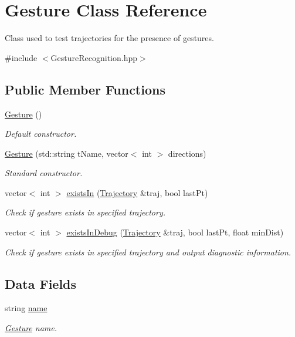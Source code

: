 \hypertarget{classGesture}{\section{\-Gesture \-Class \-Reference}
\label{classGesture}
}


\-Class used to test trajectories for the presence of gestures.  




{\ttfamily \#include $<$\-Gesture\-Recognition.\-hpp$>$}

\subsection*{\-Public \-Member \-Functions}
\begin{DoxyCompactItemize}
\item 
\hyperlink{classGesture_a840ff60bea4128f137c5b114abc844f6}{\-Gesture} ()
\begin{DoxyCompactList}\small\item\em \-Default constructor. \end{DoxyCompactList}\item 
\hyperlink{classGesture_a659397e6358ea7c376a804e00595c5a2}{\-Gesture} (std\-::string t\-Name, vector$<$ int $>$ directions)
\begin{DoxyCompactList}\small\item\em \-Standard constructor. \end{DoxyCompactList}\item 
vector$<$ int $>$ \hyperlink{classGesture_aaf8e214d540530cf9478d7b4af6db650}{exists\-In} (\hyperlink{classTrajectory}{\-Trajectory} \&traj, bool last\-Pt)
\begin{DoxyCompactList}\small\item\em \-Check if gesture exists in specified trajectory. \end{DoxyCompactList}\item 
vector$<$ int $>$ \hyperlink{classGesture_adb03c4f2f6c38867bc772d65a93ef1a1}{exists\-In\-Debug} (\hyperlink{classTrajectory}{\-Trajectory} \&traj, bool last\-Pt, float min\-Dist)
\begin{DoxyCompactList}\small\item\em \-Check if gesture exists in specified trajectory and output diagnostic information. \end{DoxyCompactList}\end{DoxyCompactItemize}
\subsection*{\-Data \-Fields}
\begin{DoxyCompactItemize}
\item 
string \hyperlink{classGesture_aece02bd8658d76b59e6dc3760a97937b}{name}
\begin{DoxyCompactList}\small\item\em \hyperlink{classGesture}{\-Gesture} name. \end{DoxyCompactList}\end{DoxyCompactItemize}
